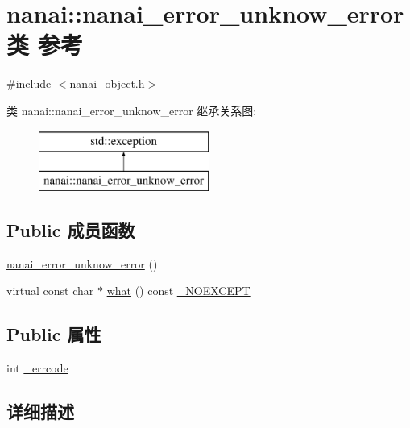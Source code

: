 \hypertarget{classnanai_1_1nanai__error__unknow__error}{}\section{nanai\+:\+:nanai\+\_\+error\+\_\+unknow\+\_\+error类 参考}
\label{classnanai_1_1nanai__error__unknow__error}


{\ttfamily \#include $<$nanai\+\_\+object.\+h$>$}

类 nanai\+:\+:nanai\+\_\+error\+\_\+unknow\+\_\+error 继承关系图\+:\begin{figure}[H]
\begin{center}
\leavevmode
\includegraphics[height=2.000000cm]{classnanai_1_1nanai__error__unknow__error}
\end{center}
\end{figure}
\subsection*{Public 成员函数}
\begin{DoxyCompactItemize}
\item 
\hyperlink{classnanai_1_1nanai__error__unknow__error_afdeee689504293bd5d7ff4950c32b709}{nanai\+\_\+error\+\_\+unknow\+\_\+error} ()
\item 
virtual const char $\ast$ \hyperlink{classnanai_1_1nanai__error__unknow__error_a4e27460d5ed88e9cb297499c5c213253}{what} () const \hyperlink{nanai__object_8h_ad7597118202b58872a4a874eab3dc1a2}{\+\_\+\+N\+O\+E\+X\+C\+E\+P\+T}
\end{DoxyCompactItemize}
\subsection*{Public 属性}
\begin{DoxyCompactItemize}
\item 
int \hyperlink{classnanai_1_1nanai__error__unknow__error_a1d843ccc2365e828549cfea01bab26f8}{\+\_\+errcode}
\end{DoxyCompactItemize}


\subsection{详细描述}


